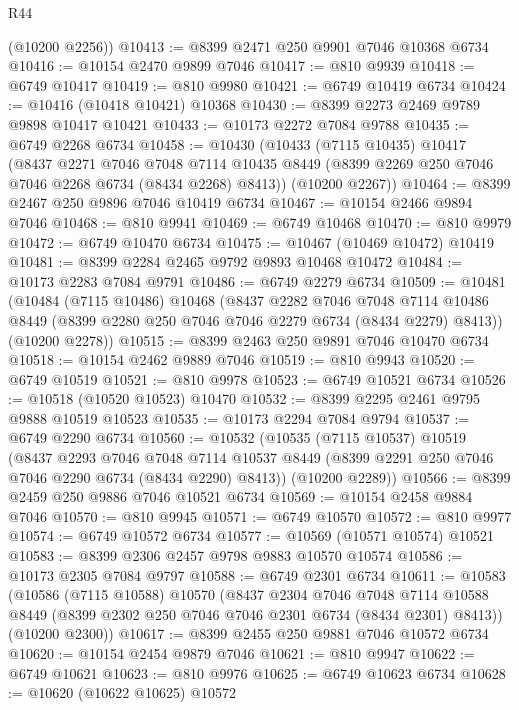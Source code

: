 \begin{lexlean}{R44}
\begin{coremodule}
{      (@10200 @2256))
@10413 := @8399 @2471 @250 @9901 @7046 @10368 @6734
@10416 := @10154 @2470 @9899 @7046
@10417 := @810 @9939
@10418 := @6749 @10417
@10419 := @810 @9980
@10421 := @6749 @10419 @6734
@10424 := @10416 (@10418 @10421) @10368
@10430 := @8399 @2273 @2469 @9789 @9898 @10417 @10421
@10433 := @10173 @2272 @7084 @9788
@10435 := @6749 @2268 @6734
@10458 := @10430
    (@10433
      (@7115 @10435)
      @10417
      (@8437
        @2271
        @7046
        @7048
        @7114
        @10435
        @8449
        (@8399 @2269 @250 @7046 @7046 @2268 @6734 (@8434 @2268) @8413))
      (@10200 @2267))
@10464 := @8399 @2467 @250 @9896 @7046 @10419 @6734
@10467 := @10154 @2466 @9894 @7046
@10468 := @810 @9941
@10469 := @6749 @10468
@10470 := @810 @9979
@10472 := @6749 @10470 @6734
@10475 := @10467 (@10469 @10472) @10419
@10481 := @8399 @2284 @2465 @9792 @9893 @10468 @10472
@10484 := @10173 @2283 @7084 @9791
@10486 := @6749 @2279 @6734
@10509 := @10481
    (@10484
      (@7115 @10486)
      @10468
      (@8437
        @2282
        @7046
        @7048
        @7114
        @10486
        @8449
        (@8399 @2280 @250 @7046 @7046 @2279 @6734 (@8434 @2279) @8413))
      (@10200 @2278))
@10515 := @8399 @2463 @250 @9891 @7046 @10470 @6734
@10518 := @10154 @2462 @9889 @7046
@10519 := @810 @9943
@10520 := @6749 @10519
@10521 := @810 @9978
@10523 := @6749 @10521 @6734
@10526 := @10518 (@10520 @10523) @10470
@10532 := @8399 @2295 @2461 @9795 @9888 @10519 @10523
@10535 := @10173 @2294 @7084 @9794
@10537 := @6749 @2290 @6734
@10560 := @10532
    (@10535
      (@7115 @10537)
      @10519
      (@8437
        @2293
        @7046
        @7048
        @7114
        @10537
        @8449
        (@8399 @2291 @250 @7046 @7046 @2290 @6734 (@8434 @2290) @8413))
      (@10200 @2289))
@10566 := @8399 @2459 @250 @9886 @7046 @10521 @6734
@10569 := @10154 @2458 @9884 @7046
@10570 := @810 @9945
@10571 := @6749 @10570
@10572 := @810 @9977
@10574 := @6749 @10572 @6734
@10577 := @10569 (@10571 @10574) @10521
@10583 := @8399 @2306 @2457 @9798 @9883 @10570 @10574
@10586 := @10173 @2305 @7084 @9797
@10588 := @6749 @2301 @6734
@10611 := @10583
    (@10586
      (@7115 @10588)
      @10570
      (@8437
        @2304
        @7046
        @7048
        @7114
        @10588
        @8449
        (@8399 @2302 @250 @7046 @7046 @2301 @6734 (@8434 @2301) @8413))
      (@10200 @2300))
@10617 := @8399 @2455 @250 @9881 @7046 @10572 @6734
@10620 := @10154 @2454 @9879 @7046
@10621 := @810 @9947
@10622 := @6749 @10621
@10623 := @810 @9976
@10625 := @6749 @10623 @6734
@10628 := @10620 (@10622 @10625) @10572
}
\end{coremodule}
\end{lexlean}
